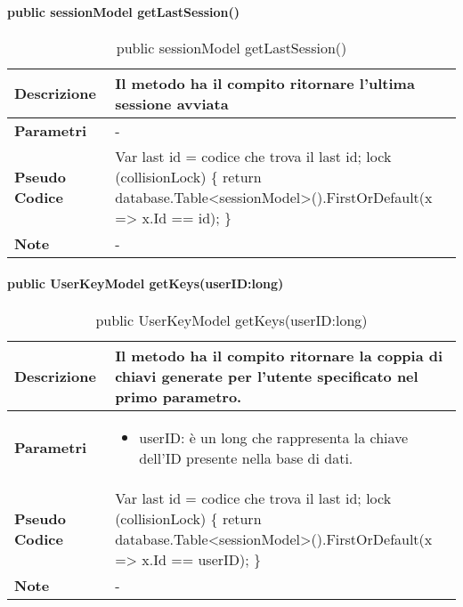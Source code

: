 \paragraph{public sessionModel getLastSession()}
\begin{center}
    \begin{longtable}{|p{3cm}|p{9cm}|}%
    \caption{public sessionModel getLastSession()}
    \label{tab:public-sessionModel-getLastSession}
    \endfirsthead
    \endhead
    \hline
    \textbf{Descrizione} & Il metodo ha il compito ritornare l’ultima sessione avviata\\
    \hline
    \textbf{Parametri} &      
    -
    \\
    \hline
    \textbf{Pseudo Codice} & 
    Var last id = codice che trova il last id;\newline
    lock (collisionLock)\newline
    \{\newline
        return database.Table<sessionModel>().FirstOrDefault(x => x.Id == id);\newline
    \}\newline
    \\
    \hline
    \textbf{Note} & 
    -
    \\
    \hline
    \end{longtable}
    \end{center}


\paragraph{public UserKeyModel getKeys(userID:long)}
\begin{center}
    \begin{longtable}{|p{3cm}|p{9cm}|}%
    \caption{public UserKeyModel getKeys(userID:long)}
    \label{tab:public-userkeymodel-getKeys}
    \endfirsthead
    \endhead
    \hline
    \textbf{Descrizione} & Il metodo ha il compito ritornare la coppia di chiavi generate per l’utente specificato nel primo parametro.\\
    \hline
    \textbf{Parametri} &      
    \begin{itemize}
        \item userID: è un long che rappresenta la chiave dell’ID presente nella base di dati.
    \end{itemize}
    \\
    \hline
    \textbf{Pseudo Codice} & 
    Var last id = codice che trova il last id;\newline
    lock (collisionLock)\newline
    \{\newline
        return database.Table<sessionModel>().FirstOrDefault(x => x.Id == userID);\newline
    \}\newline
    \\
    \hline
    \textbf{Note} & 
    -
    \\
    \hline
    \end{longtable}
    \end{center}



